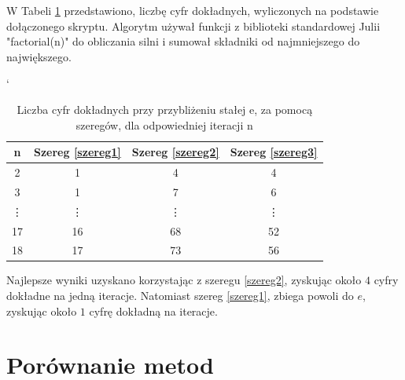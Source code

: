 \documentclass{article}
\begin{document}
W Tabeli \ref{res,szeregi} przedstawiono, liczbę cyfr dokładnych, wyliczonych na podstawie dołączonego skryptu. Algorytm używał funkcji z biblioteki standardowej Julii "factorial(n)" do obliczania silni i sumował składniki od najmniejszego do największego.
\\
\begin{table}[h]
`	\centering
	\begin{tabular}{|c|c|c|c|}	\hline
		n & Szereg \eqref{szereg1} & Szereg \eqref{szereg2} & Szereg \eqref{szereg3} \\ \hline
		2 & 1& 4& 4 \\
		3 & 1& 7& 6 \\
		\vdots & \vdots & \vdots & \vdots \\
		17 & 16& 68& 52 \\
		18 & 17& 73& 56 \\ \hline
	\end{tabular}
	\caption{Liczba cyfr dokładnych przy przybliżeniu stałej e, za pomocą szeregów, dla odpowiedniej iteracji n}
	\label{res,szeregi}
\end{table}

Najlepsze wyniki uzyskano korzystając z szeregu \eqref{szereg2}, zyskując około $4$ cyfry dokładne na jedną iteracje. Natomiast szereg \eqref{szereg1}, zbiega powoli do $e$, zyskując około $1$ cyfrę dokładną na iteracje.

\section{Porównanie metod}
\end{document}
